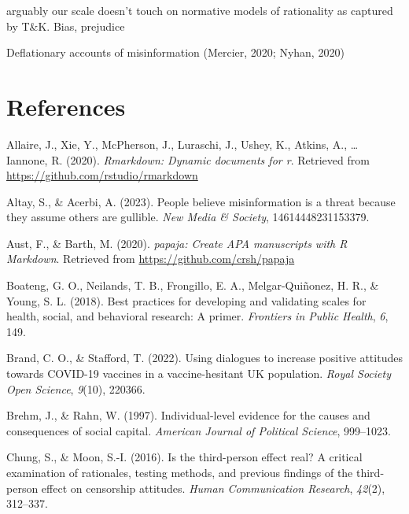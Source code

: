 \documentclass[
  ,jou,floatsintext]{apa6}
\newlength{\cslhangindent}
\newlength{\cslentryspacingunit} %
\newenvironment{CSLReferences}[2] %
 {%
  \setlength{\parindent}{0pt}
  \ifodd #1
  \let\oldpar\par
  \def\par{\hangindent=\cslhangindent\oldpar}
  \fi
  \setlength{\parskip}{#2\cslentryspacingunit}
 }%
 {}
\begin{document}
arguably our scale doesn't touch on normative models of rationality as captured by T\&K. Bias, prejudice

Deflationary accounts of misinformation (Mercier, 2020; Nyhan, 2020)

\hypertarget{references}{%
\section*{References}\label{references}}

\hypertarget{refs}{}
\begin{CSLReferences}{1}{0}
\leavevmode{}%
Allaire, J., Xie, Y., McPherson, J., Luraschi, J., Ushey, K., Atkins, A., \ldots{} Iannone, R. (2020). \emph{Rmarkdown: Dynamic documents for r}. Retrieved from \url{https://github.com/rstudio/rmarkdown}

\leavevmode{}%
Altay, S., \& Acerbi, A. (2023). People believe misinformation is a threat because they assume others are gullible. \emph{New Media \& Society}, 14614448231153379.

\leavevmode{}%
Aust, F., \& Barth, M. (2020). \emph{{papaja}: {Create} {APA} manuscripts with {R Markdown}}. Retrieved from \url{https://github.com/crsh/papaja}

\leavevmode{}%
Boateng, G. O., Neilands, T. B., Frongillo, E. A., Melgar-Quiñonez, H. R., \& Young, S. L. (2018). Best practices for developing and validating scales for health, social, and behavioral research: A primer. \emph{Frontiers in Public Health}, \emph{6}, 149.

\leavevmode{}%
Brand, C. O., \& Stafford, T. (2022). Using dialogues to increase positive attitudes towards COVID-19 vaccines in a vaccine-hesitant UK population. \emph{Royal Society Open Science}, \emph{9}(10), 220366.

\leavevmode{}%
Brehm, J., \& Rahn, W. (1997). Individual-level evidence for the causes and consequences of social capital. \emph{American Journal of Political Science}, 999--1023.

\leavevmode{}%
Chung, S., \& Moon, S.-I. (2016). Is the third-person effect real? A critical examination of rationales, testing methods, and previous findings of the third-person effect on censorship attitudes. \emph{Human Communication Research}, \emph{42}(2), 312--337.


\end{CSLReferences}
\end{document}
